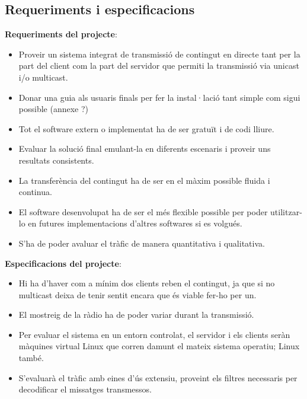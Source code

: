 \subsection{Requeriments i especificacions}
{
    \textbf{Requeriments del projecte}:
    \begin{itemize}
        \item Proveir un sistema integrat de transmissió de contingut en directe tant per la part del client
                com la part del servidor que permiti la transmissió via unicast i/o multicast.
        \item Donar una guia als usuaris finals per fer la instal·lació tant simple com sigui possible (annexe ?)
        \item Tot el software extern o implementat ha de ser gratuït i de codi lliure.
        \item Evaluar la solució final emulant-la en diferents escenaris i proveir uns resultats consistents.
        \item La transferència del contingut ha de ser en el màxim possible fluida i continua.
        \item El software desenvolupat ha de ser el més flexible possible per poder utilitzar-lo en futures
                implementacions d'altres softwares si es volgués.
        \item S'ha de poder avaluar el tràfic de manera quantitativa i qualitativa.
    \end{itemize}
    
    \textbf{Especificacions del projecte}:
    \begin{itemize}
        \item Hi ha d'haver com a mínim dos clients reben el contingut, ja que si no multicast deixa de tenir sentit encara
                que és viable fer-ho per un.
        \item El mostreig de la ràdio ha de poder variar durant la transmissió.
        \item Per evaluar el sistema en un entorn controlat, el servidor i els clients seràn màquines virtual Linux que corren
                damunt el mateix sistema operatiu; Linux també.
        \item S'evaluarà el tràfic amb eines d'ús extensiu, proveint els filtres necessaris per decodificar el missatges transmessos.
    \end{itemize}
}

